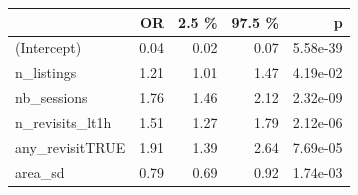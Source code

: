 \begin{tabular}{lrrrr}
  \toprule
 & OR & 2.5 \% & 97.5 \% & p \\ 
  \midrule
(Intercept) & 0.04 & 0.02 & 0.07 & 5.58e-39 \\ 
  n\_listings & 1.21 & 1.01 & 1.47 & 4.19e-02 \\ 
  nb\_sessions & 1.76 & 1.46 & 2.12 & 2.32e-09 \\ 
  n\_revisits\_lt1h & 1.51 & 1.27 & 1.79 & 2.12e-06 \\ 
  any\_revisitTRUE & 1.91 & 1.39 & 2.64 & 7.69e-05 \\ 
  area\_sd & 0.79 & 0.69 & 0.92 & 1.74e-03 \\ 
   \bottomrule
\end{tabular}

